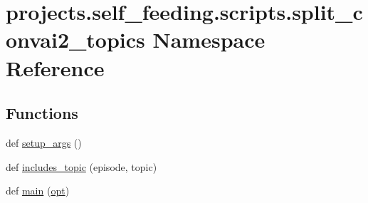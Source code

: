 \hypertarget{namespaceprojects_1_1self__feeding_1_1scripts_1_1split__convai2__topics}{}\section{projects.\+self\+\_\+feeding.\+scripts.\+split\+\_\+convai2\+\_\+topics Namespace Reference}
\label{namespaceprojects_1_1self__feeding_1_1scripts_1_1split__convai2__topics}
\subsection*{Functions}
\begin{DoxyCompactItemize}
\item 
def \hyperlink{namespaceprojects_1_1self__feeding_1_1scripts_1_1split__convai2__topics_a182c9e1c2ca6bd71added31ed7088eee}{setup\+\_\+args} ()
\item 
def \hyperlink{namespaceprojects_1_1self__feeding_1_1scripts_1_1split__convai2__topics_a273e2c722d60a60b074557be2a4a0714}{includes\+\_\+topic} (episode, topic)
\item 
def \hyperlink{namespaceprojects_1_1self__feeding_1_1scripts_1_1split__convai2__topics_ab05b7abb9e9f7c1778462fc1ac5345f1}{main} (\hyperlink{namespaceprojects_1_1self__feeding_1_1scripts_1_1split__convai2__topics_a1f2fc3e102502ed3b903842d95b5d109}{opt})
\end{DoxyCompactItemize}
